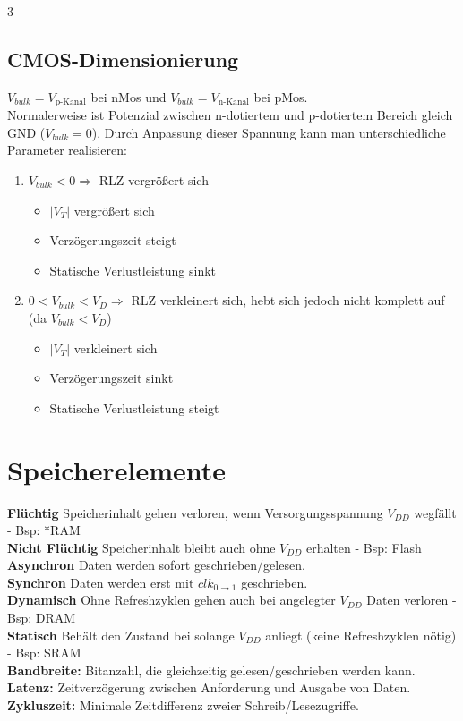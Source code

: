\documentclass[6pt,a4paper]{scrartcl}
\renewcommand{\emph}[1]{\textsf{\textbf{#1}}}
\newcommand{\ra}[0]{\ensuremath{\rightarrow}} 									%
\begin{document}
\begin{multicols*}{3}
	\subsection{CMOS-Dimensionierung}
	$V_{bulk}=V_{\text{p-Kanal}}$ bei nMos und $V_{bulk}=V_{\text{n-Kanal}}$ bei pMos.\\
	Normalerweise ist Potenzial zwischen n-dotiertem und p-dotiertem Bereich gleich GND ($V_{bulk}=0$). Durch Anpassung dieser Spannung kann man unterschiedliche Parameter realisieren:
	\begin{enumerate}
		\item $V_{bulk} < 0 \Rightarrow$ RLZ vergrößert sich \begin{itemize}\itemsep0pt
			      \item $|V_T|$ vergrößert sich
			      \item Verzögerungszeit steigt
			      \item Statische Verlustleistung sinkt
		      \end{itemize}
		\item $0 < V_{bulk} < V_D \Rightarrow$ RLZ verkleinert sich, hebt sich jedoch nicht komplett auf (da $V_{bulk} < V_D$) \begin{itemize}\itemsep0pt
			      \item $|V_T|$ verkleinert sich
			      \item Verzögerungszeit sinkt
			      \item Statische Verlustleistung steigt
		      \end{itemize}
	\end{enumerate}

	\section{Speicherelemente}
	\emph{Flüchtig} Speicherinhalt gehen verloren, wenn Versorgungsspannung $V_{DD}$ wegfällt - Bsp: *RAM\\
	\emph{Nicht Flüchtig} Speicherinhalt bleibt auch ohne $V_{DD}$ erhalten - Bsp: Flash\\
	\emph{Asynchron} Daten werden sofort geschrieben/gelesen.\\
	\emph{Synchron} Daten werden erst mit $clk_{0 \ra 1}$ geschrieben.\\
	\emph{Dynamisch} Ohne Refreshzyklen gehen auch bei angelegter $V_{DD}$ Daten verloren -  Bsp: DRAM\\
	\emph{Statisch} Behält den Zustand bei solange $V_{DD}$ anliegt (keine Refreshzyklen nötig) - Bsp: SRAM\\
	\emph{Bandbreite:} Bitanzahl, die gleichzeitig gelesen/geschrieben werden kann.
	\emph{Latenz:} Zeitverzögerung zwischen Anforderung und Ausgabe von Daten.
	\emph{Zykluszeit:} Minimale Zeitdifferenz zweier Schreib/Lesezugriffe.


\end{multicols*}
\end{document}
